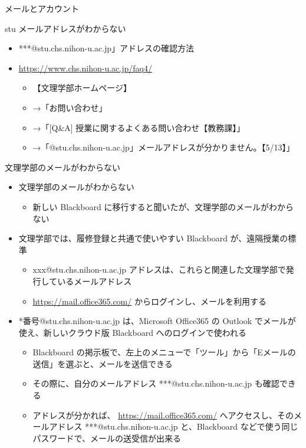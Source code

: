 \documentclass[a4j,10pt]{jsarticle}
\begin{document}
{\newpage\clearpage
{}%
\begin{frame}[label={sec:org4aad05a},fragile]{メールとアカウント}
\begin{block}{stu メールアドレスがわからない}
\begin{itemize}
\item ***@stu.chs.nihon-u.ac.jp」アドレスの確認方法
\item \url{https://www.chs.nihon-u.ac.jp/faq4/}
\begin{itemize}
\item 【文理学部ホームページ】
\item →「お問い合わせ」
\item →「[Q\&A] 授業に関するよくある問い合わせ【教務課】」
\item →「@stu.chs.nihon-u.ac.jp」メールアドレスが分かりません。【5/13】」
\end{itemize}
\end{itemize}
\end{block}
\par
\begin{block}{文理学部のメールがわからない}
\begin{itemize}
\item 文理学部のメールがわからない
\begin{itemize}
\item 新しい Blackboard に移行すると聞いたが、文理学部のメールがわからない
\end{itemize}
\par
\item 文理学部では、履修登録と共通で使いやすい Blackboard が、遠隔授業の標準
\begin{itemize}
\item xxx@stu.chs.nihon-u.ac.jp アドレスは、これらと関連した文理学部で発行しているメールアドレス
\item \url{https://mail.office365.com/} からログインし、メールを利用する
\end{itemize}
\par
\item *番号@stu.chs.nihon-u.ac.jp は、Microsoft Office365 の Outlook でメールが使え、新しいクラウド版 Blackboard へのログインで使われる
\begin{itemize}
\item Blackboard の掲示板で、左上のメニューで「ツール」から「Eメールの送信」を選ぶと、メールを送信できる
\item その際に、自分のメールアドレス ***@stu.chs.nihon-u.ac.jp も確認できる
\item アドレスが分かれば、 \url{https://mail.office365.com/} へアクセスし、そのメールアドレス ***@stu.chs.nihon-u.ac.jp と、Blackboard などで使う同じパスワードで、メールの送受信が出来る

\end{itemize}
\end{itemize}
\end{block}
\end{frame}}
\end{document}
